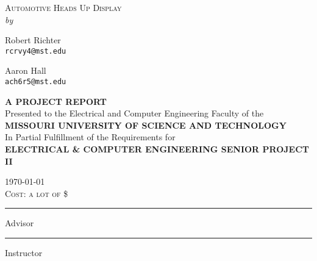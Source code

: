\begin{titlepage}

\begin{center}
\textsc{\LARGE Automotive Heads Up Display} \\[2cm]

\textit{by} \\[0.5cm]

\begin{multicols}{2}
Robert Richter\\
\texttt{rcrvy4@mst.edu}\\

\columnbreak

Aaron Hall\\
\texttt{ach6r5@mst.edu}
\end{multicols}

\vspace{3 cm}

\textsc{\small \textbf{A PROJECT REPORT}} \\[0.5cm]
{\small Presented to the Electrical and Computer Engineering Faculty of the} \\[0.5cm]
\textsc{\small \textbf{MISSOURI UNIVERSITY OF SCIENCE AND TECHNOLOGY}} \\[0.5cm]
{\small In Partial Fulfillment of the Requirements for} \\[0.5cm]
\textsc{\small \textbf{ELECTRICAL \& COMPUTER ENGINEERING SENIOR PROJECT II}} \\[1cm]

\vfill

\textsc{\today} \\[3mm]
\textsc{Cost: a lot of \$} \\[2cm]

\begin{multicols}{2}
\hrule
\vspace{1mm}
Advisor\\
\columnbreak
\hrule
\vspace{1mm}
Instructor
\end{multicols}

\end{center}
\end{titlepage}
